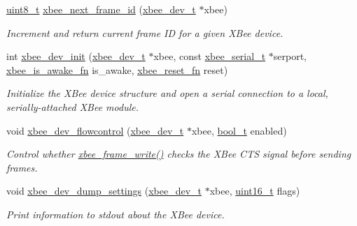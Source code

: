 \begin{DoxyCompactItemize}
\item 
\hyperlink{group__hal_gae1affc9ca37cfb624959c866a73f83c2}{uint8\-\_\-t} \hyperlink{group__xbee__device_ga9faca10d7a960dcd3c0c3ad9c0d59cab}{xbee\-\_\-next\-\_\-frame\-\_\-id} (\hyperlink{structxbee__dev__t}{xbee\-\_\-dev\-\_\-t} $\ast$xbee)
\begin{DoxyCompactList}\small\item\em Increment and return current frame I\-D for a given X\-Bee device. \end{DoxyCompactList}\item 
int \hyperlink{group__xbee__device_ga550d7c865e75d3fc1df0e64cb880cf3d}{xbee\-\_\-dev\-\_\-init} (\hyperlink{structxbee__dev__t}{xbee\-\_\-dev\-\_\-t} $\ast$xbee, const \hyperlink{structxbee__serial__t}{xbee\-\_\-serial\-\_\-t} $\ast$serport, \hyperlink{group__xbee__device_gace56b1c8dd7dc5a23f6fa01878d45b09}{xbee\-\_\-is\-\_\-awake\-\_\-fn} is\-\_\-awake, \hyperlink{group__xbee__device_ga7f2f41997c6215582cf3491c984b31ea}{xbee\-\_\-reset\-\_\-fn} reset)
\begin{DoxyCompactList}\small\item\em Initialize the X\-Bee device structure and open a serial connection to a local, serially-\/attached X\-Bee module. \end{DoxyCompactList}\item 
void \hyperlink{group__xbee__device_ga75bfe1292b8af0588e0e322a42d3d2dc}{xbee\-\_\-dev\-\_\-flowcontrol} (\hyperlink{structxbee__dev__t}{xbee\-\_\-dev\-\_\-t} $\ast$xbee, \hyperlink{group__hal_ga04dd5074964518403bf944f2b240a5f8}{bool\-\_\-t} enabled)
\begin{DoxyCompactList}\small\item\em Control whether \hyperlink{group__xbee__device_ga51f281b72bffcc99eec0e8c7f65a5f3f}{xbee\-\_\-frame\-\_\-write()} checks the X\-Bee C\-T\-S signal before sending frames. \end{DoxyCompactList}\item 
void \hyperlink{group__xbee__device_ga96267a6b36d9a1b1d59b16cc60a2b09a}{xbee\-\_\-dev\-\_\-dump\-\_\-settings} (\hyperlink{structxbee__dev__t}{xbee\-\_\-dev\-\_\-t} $\ast$xbee, \hyperlink{group__hal_ga5a8b2dc9e45a9ee81a94ef304fb62505}{uint16\-\_\-t} flags)
\begin{DoxyCompactList}\small\item\em Print information to stdout about the X\-Bee device. \end{DoxyCompactList}\item 

\end{DoxyCompactItemize}

